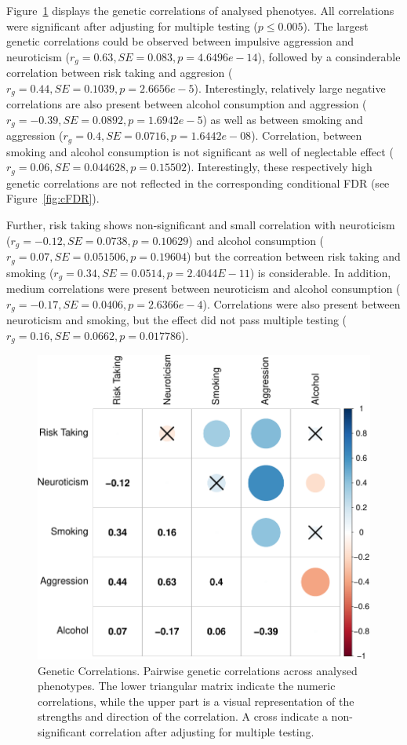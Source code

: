 Figure~\ref{fig:gcor} displays the genetic correlations of analysed phenotyes.
All correlations were significant after adjusting for multiple testing ($p\leq0.005$).
The largest genetic correlations could be observed between impulsive aggression and neuroticism ($r_g=0.63, SE=0.083, p=4.6496e-14$), 
followed by a consinderable correlation between risk taking and aggresion ($r_g=0.44, SE=0.1039, p=2.6656e-5$).
Interestingly, relatively large negative correlations are also present between alcohol consumption and aggression ($r_g=-0.39, SE=0.0892, p=1.6942e-5$)
as well as between smoking and aggression ($r_g=0.4, SE=0.0716, p=1.6442e-08$).
Correlation, between smoking and alcohol consumption is not significant as well of neglectable effect ($r_g=0.06, SE=0.044628, p=0.15502$).
Interestingly, these respectively high genetic correlations are not reflected in the corresponding conditional FDR (see Figure~\ref{fig:cFDR}).

Further, risk taking shows non-significant and small correlation with neuroticism ($r_g=-0.12, SE=0.0738, p=0.10629$) and
alcohol consumption ($r_g=0.07, SE=0.051506, p=0.19604$) but the correation between risk taking and smoking ($r_g=0.34, SE=0.0514, p=2.4044E-11$) is considerable.
In addition, medium correlations were present between neuroticism and alcohol consumption ($r_g=-0.17, SE=0.0406, p=2.6366e-4$). 
Correlations were also present between neuroticism and smoking, but the effect did not pass multiple testing ($r_g=0.16, SE=0.0662, p=0.017786$).

\begin{figure}[!h]
	\centering
  \includegraphics[width=0.8\linewidth]{ukb_assoc/figure/genetic_corr/gcorr_plot_circle_full_se.pdf}
  \caption{Genetic Correlations.
    Pairwise genetic correlations across analysed phenotypes.
    The lower triangular matrix indicate the numeric correlations, while the upper part is a visual representation of the strengths and direction of the correlation.
    A cross indicate a non-significant correlation after adjusting for multiple testing.
  }\label{fig:gcor}
\end{figure}


